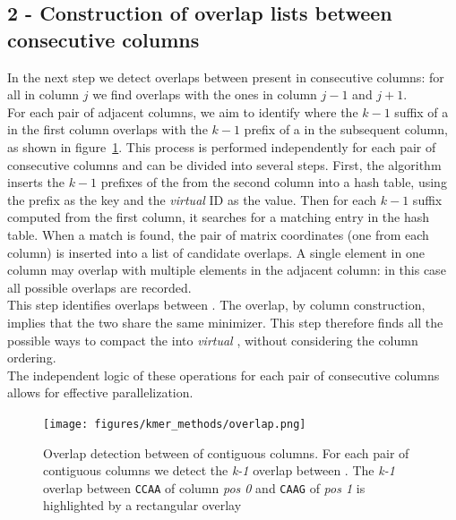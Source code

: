 \subsection{2 - Construction of overlap lists between consecutive columns}
\label{sec:skmeroverlap}
In the next step we detect overlaps between \kmers present in consecutive columns: for all \kmers in column $j$ we find overlaps with the ones in column $j-1$ and $j+1$.\\
For each pair of adjacent columns, we aim to identify where the $k-1$ suffix of a \kmer in the first column overlaps with the $k-1$ prefix of a \kmer in the subsequent column, as shown in figure~\ref{fig:skmer_overlap}. This process is performed independently for each pair of consecutive columns and can be divided into several steps. First, the algorithm inserts the $k-1$ prefixes of the \kmers from the second column into a hash table, using the prefix as the key and the \emph{virtual} \skmer ID as the value. Then for each $k-1$ suffix computed from the first column, it searches for a matching entry in the hash table. When a match is found, the pair of matrix coordinates (one from each column) is inserted into a list of candidate overlaps. A single element in one column may overlap with multiple elements in the adjacent column: in this case all possible overlaps are recorded.\\
This step identifies overlaps between \kmers. The overlap, by column construction, implies that the two \kmers share the same minimizer. This step therefore finds all the possible ways to compact the \kmers into \emph{virtual} \skmers, without considering the column ordering.\\
The independent logic of these operations for each pair of consecutive columns allows for effective parallelization.

\begin{figure}[H]
	\centering
	\texttt{[image: figures/kmer\_methods/overlap.png]}
	\caption[Overlap detection between \kmers of contiguous columns.]{Overlap detection between \kmers of contiguous columns. For each pair of contiguous columns we detect the \emph{k-1} overlap between \kmers. The \emph{k-1} overlap between \texttt{CCAA} of column \emph{pos 0} and \texttt{CAAG} of \emph{pos 1} is highlighted by a rectangular overlay}
	\label{fig:skmer_overlap}
\end{figure}


